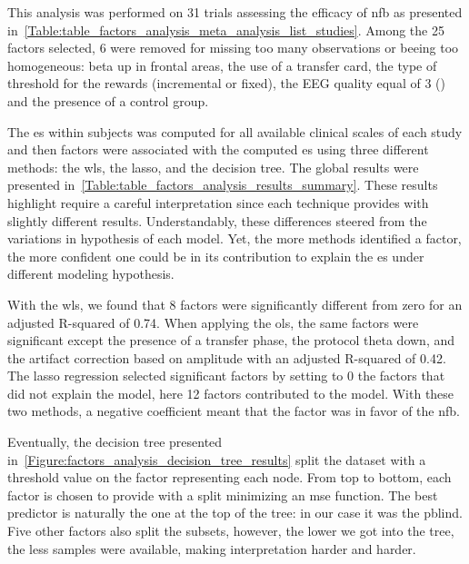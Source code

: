 This analysis was performed on 31 trials assessing the efficacy of \gls{nfb} as presented in~\ref{Table:table_factors_analysis_meta_analysis_list_studies}. 
Among the 25 factors selected, 6 were removed for missing too many observations or beeing too homogeneous: beta up in frontal areas, 
the use of a transfer card, the type of threshold for the rewards (incremental or fixed), the EEG quality equal of 3
() and the presence of a control group. 

The \gls{es} within subjects was computed for all available clinical scales of each study and then factors were associated with the computed \gls{es}
using three different methods: the \gls{wls}, the \gls{lasso}, and the decision tree. The global results were presented in~\ref{Table:table_factors_analysis_results_summary}.
These results highlight require a careful interpretation since each technique provides with slightly different
results. Understandably, these differences steered from the variations in hypothesis of each model. Yet, the more
methods identified a factor, the more confident one could be in its contribution to explain the \gls{es} under different
modeling hypothesis.

With the \gls{wls}, we found that 8 factors were
significantly different from zero for an adjusted R-squared of 0.74. 
When applying the \gls{ols}, the same factors were significant except the presence of a transfer phase, the protocol
theta down, and the artifact correction
based on amplitude with an adjusted R-squared of 0.42. The \gls{lasso} regression selected significant factors by setting to 0 the factors that did
not explain the model, here 12 factors contributed to the model. With these two methods, a negative coefficient meant that the factor was in favor of the \gls{nfb}.

Eventually, the decision tree presented in~\ref{Figure:factors_analysis_decision_tree_results} split the dataset
with a threshold value on the factor representing each node. From top to bottom, each factor is chosen to provide with a
split minimizing an \gls{mse} function. The best predictor is naturally the one at the top of the tree: in our case it was the \gls{pblind}. Five other factors also split the subsets,  
however, the lower we got into the tree, the less samples were available, making interpretation harder and harder.  

